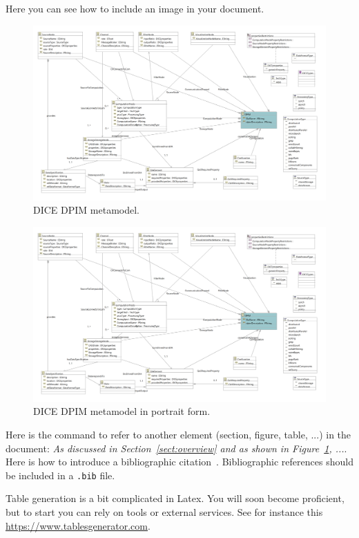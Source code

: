 \sffamily
Here you can see how to include an image in your document.

\begin{figure}
\centering
\includegraphics[width=\textwidth]{Images/11.png}
\caption{\label{fig:metamodel}DICE DPIM metamodel.}
\end{figure}

\begin{figure}
\centering
\includegraphics[width=\textwidth]{Images/11.png}
\caption{\label{fig:metamodel2}DICE DPIM metamodel in portrait form.}
\end{figure}

Here is the command to refer to another element (section, figure, table, ...) in the document: \emph{As discussed in Section~\ref{sect:overview} and as shown in Figure~\ref{fig:metamodel}, ...}. Here is how to introduce a bibliographic citation~\cite{DAM}. Bibliographic references should be included in a \texttt{.bib} file. 

Table generation is a bit complicated in Latex. You will soon become proficient, but to start you can rely on tools or external services. See for instance this \href{https://www.tablesgenerator.com}{https://www.tablesgenerator.com}. \\

